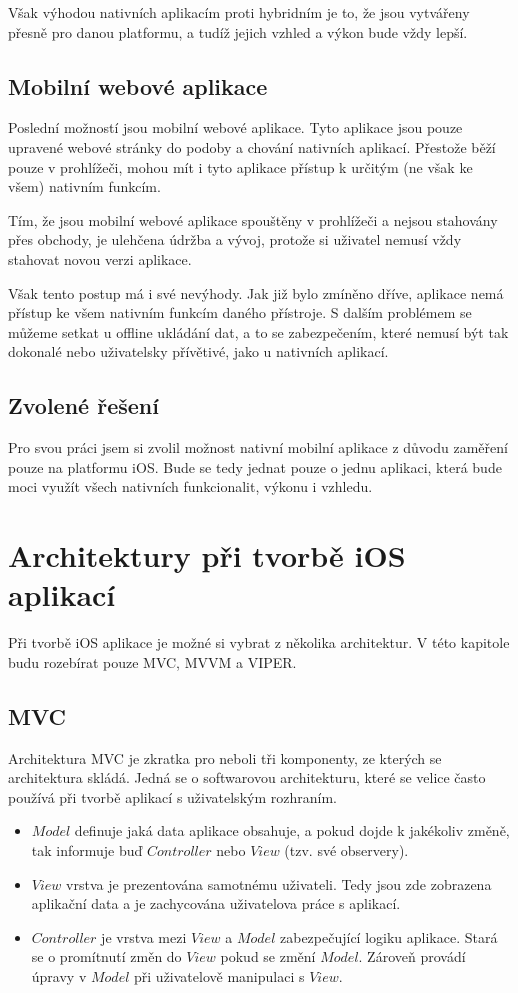 \documentclass[thesis=M,czech]{FITthesis}[2012/06/26]
\begin{document}
Však výhodou nativních aplikacím proti hybridním je to, že jsou vytvářeny přesně pro danou platformu, a tudíž jejich vzhled a výkon bude vždy lepší. \cite{upwork}

\subsection{Mobilní webové aplikace}
Poslední možností jsou mobilní webové aplikace. Tyto aplikace jsou pouze upravené webové stránky do podoby a chování nativních aplikací. Přestože běží pouze v prohlížeči, mohou mít i tyto aplikace přístup k určitým (ne však ke všem) nativním funkcím. \cite{Nielsen}

Tím, že jsou mobilní webové aplikace spouštěny v prohlížeči a nejsou stahovány přes obchody, je ulehčena údržba a vývoj, protože si uživatel nemusí vždy stahovat novou verzi aplikace.

Však tento postup má i své nevýhody. Jak již bylo zmíněno dříve, aplikace nemá přístup ke všem nativním funkcím daného přístroje. S dalším problémem se můžeme setkat u offline ukládání dat, a to se zabezpečením, které nemusí být tak dokonalé nebo uživatelsky přívětivé, jako u nativních aplikací.  \cite{saleforce}

\subsection{Zvolené řešení}
Pro svou práci jsem si zvolil možnost nativní mobilní aplikace z důvodu zaměření pouze na platformu iOS. Bude se tedy jednat pouze o jednu aplikaci, která bude moci využít všech nativních funkcionalit, výkonu i vzhledu.

\section{Architektury při tvorbě iOS aplikací}
Při tvorbě iOS aplikace je možné si vybrat z několika architektur. V této kapitole budu rozebírat pouze MVC, MVVM a VIPER.

\subsection{MVC}
Architektura MVC je zkratka pro  neboli tři komponenty, ze kterých se architektura skládá. Jedná se o softwarovou architekturu, které se velice často používá při tvorbě aplikací s uživatelským rozhraním. \cite{MVCMozilla}
\begin{itemize}
\item $Model$ definuje jaká data aplikace obsahuje, a pokud dojde k jakékoliv změně, tak informuje buď $Controller$ nebo $View$ (tzv. své observery). \cite{MVCGoogle}
\item $View$ vrstva je prezentována samotnému uživateli. Tedy jsou zde zobrazena aplikační data a je zachycována uživatelova práce s aplikací.\cite{MVCMozilla}
\item $Controller$ je vrstva mezi $View$ a $Model$ zabezpečující logiku aplikace. Stará se o promítnutí změn do $View$ pokud se změní $Model$. Zároveň provádí úpravy v $Model$ při uživatelově manipulaci s $View$.  \cite{MVCGoogle}
\end{itemize}
\end{document}
